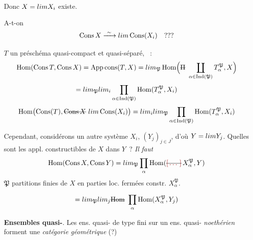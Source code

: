 \documentclass[11pt,a4paper]{article}
\begin{document}
Donc $X = \varprojlim X_i$ existe.

A-t-on \struck{\ill{}}
\[
\operatorname{Cons} X \xrightarrow{\ \sim\ } \varprojlim \operatorname{Cons}(X_i) \quad ???
\]

 $T$ un préschéma quasi-compact et quasi-séparé,
 \ill{} \ill{}~:
\[
\operatorname{Hom}(\operatorname{Cons} T, \operatorname{Cons} X) = \operatorname{App\,cons}(T, X)
= \varinjlim_{\mathfrak{P}} \operatorname{Hom}\Bigl(\text{\struck{$\Pi$}}\ \coprod_{\alpha \in \operatorname{Ind}(\mathfrak{P})} T_{\alpha}^{\mathfrak{P}}, X\Bigr)
\]
\[
= \varinjlim_{\mathfrak{P}} \varprojlim_{i} \prod_{\alpha \in \operatorname{Ind}(\mathfrak{P})} \operatorname{Hom}(T_{\alpha}^{\mathfrak{P}}, X_i)
\]
\[
\operatorname{Hom}\bigl(\operatorname{Cons}(T), \text{\struck{$\operatorname{Cons} X$}}\ \varprojlim \operatorname{Cons}(X_i)\bigr)
= \varprojlim_{i} \varinjlim_{\mathfrak{P}} \prod_{\alpha \in \operatorname{Ind}(\mathfrak{P})} \operatorname{Hom}(T_{\alpha}^{\mathfrak{P}}, X_i)
\]

Cependant, considérons un autre système 
$X_i$,  $(Y_j)_{j \in J}$, d'où
$Y = \varprojlim Y_j$.
Quelles sont les  appl. constructibles de
$X$ dans $Y$~? \emph{Il faut \ill{}} 
\[
\operatorname{Hom}(\operatorname{Cons} X, \operatorname{Cons} Y) = \varinjlim_{\mathfrak{P}} \prod_{\alpha} \operatorname{Hom}(\text{\struck{\ill{}}}\, X_{\alpha}^{\mathfrak{P}}, Y)
\]
$\mathfrak{P}$ partitions finies de $X$ en parties loc. fermées constr. $X_{\alpha}^{\mathfrak{P}}$.

\[
= \varinjlim_{\mathfrak{P}} \varprojlim_{j} \text{\struck{$\operatorname{Hom}$}}\ \prod_{\alpha} \operatorname{Hom}(X_{\alpha}^{\mathfrak{P}}, Y_j)
\]

\textbf{Ensembles quasi-}.
Les ens. quasi- de type fini sur un
\struck{\ill{}} ens. quasi- \emph{noethérien}
forment une \emph{catégorie géométrique} (?)


\end{document}
